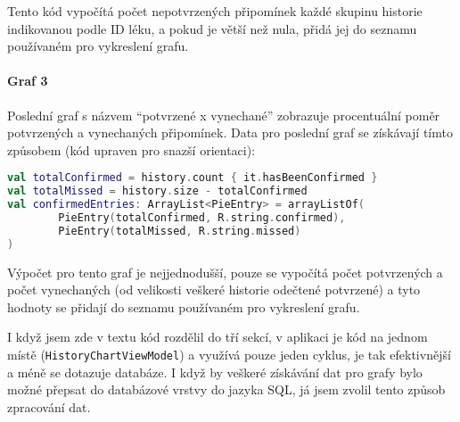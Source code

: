 \documentclass[../TakeYourPill.tex]{subfiles}
\begin{document}
Tento kód vypočítá počet nepotvrzených připomínek každé skupinu historie indikovanou podle ID léku, a pokud je větší než nula, přidá jej do seznamu používaném pro vykreslení grafu.


\paragraph{Graf 3} Poslední graf s názvem \enquote{potvrzené x vynechané} zobrazuje procentuální poměr potvrzených a vynechaných připomínek. Data pro poslední graf se získávají tímto způsobem (kód upraven pro snazší orientaci):

\setmonofont{JetBrains Mono}
\begin{lstlisting}[language=Kotlin]
val totalConfirmed = history.count { it.hasBeenConfirmed }
val totalMissed = history.size - totalConfirmed
val confirmedEntries: ArrayList<PieEntry> = arrayListOf(
        PieEntry(totalConfirmed, R.string.confirmed),
        PieEntry(totalMissed, R.string.missed)
)
\end{lstlisting}
\setmonofont{Latin Modern Mono}

Výpočet pro tento graf je nejjednodušší, pouze se vypočítá počet potvrzených a počet vynechaných (od velikosti veškeré historie odečtené potvrzené) a tyto hodnoty se přidají do seznamu používaném pro vykreslení grafu.

I když jsem zde v textu kód rozdělil do tří sekcí, v aplikaci je kód na jednom místě (\texttt{HistoryChartViewModel}) a využívá pouze jeden cyklus, je tak efektivnější a méně se dotazuje databáze. I když by veškeré získávání dat pro grafy bylo možné přepsat do databázové vrstvy do jazyka SQL, já jsem zvolil tento způsob zpracování dat.
\end{document}
